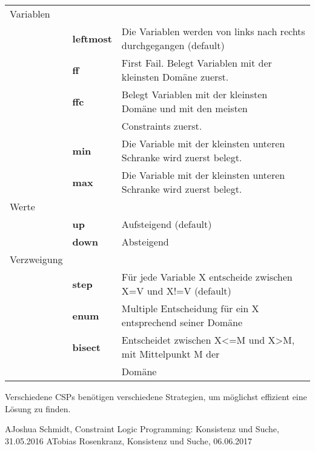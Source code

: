 \begin{table}[]
\centering
\begin{tabular}{lll}
Variablen   &                   &                                                                                                \\
            & \textbf{leftmost} & Die Variablen werden von links nach rechts durchgegangen (default)                             \\
            & \textbf{ff}       & First Fail. Belegt Variablen mit der kleinsten Domäne zuerst. \\
            & \textbf{ffc}      & Belegt Variablen mit der kleinsten Domäne und mit den meisten \\ & & Constraints zuerst.              \\
            & \textbf{min}      & Die Variable mit der kleinsten unteren Schranke wird zuerst belegt.                            \\
            & \textbf{max}      & Die Variable mit der kleinsten unteren Schranke wird zuerst belegt.                            \\
Werte  & &\\     & \textbf{up}       & Aufsteigend (default)                                                                          \\
            & \textbf{down}     & Absteigend                                                                                     \\
Verzweigung &                   &                                                                                                \\
            & \textbf{step}     & Für jede Variable X entscheide zwischen X=V und X!=V (default)                                 \\
            & \textbf{enum}     & Multiple Entscheidung für ein X entsprechend seiner Domäne                                     \\
            & \textbf{bisect}   & Entscheidet zwischen X<=M und X>M, mit Mittelpunkt M der \\ &  & Domäne
\end{tabular}
\end{table}
Verschiedene CSPs benötigen verschiedene Strategien, um möglichst effizient eine Lösung zu finden.

\begin{thebibliography}{999}
\bibitem [JS] AJoshua Schmidt, Constraint Logic Programming: Konsistenz und Suche, 31.05.2016
\bibitem [TR] ATobias Rosenkranz, Konsistenz und Suche, 06.06.2017
\end{thebibliography}
